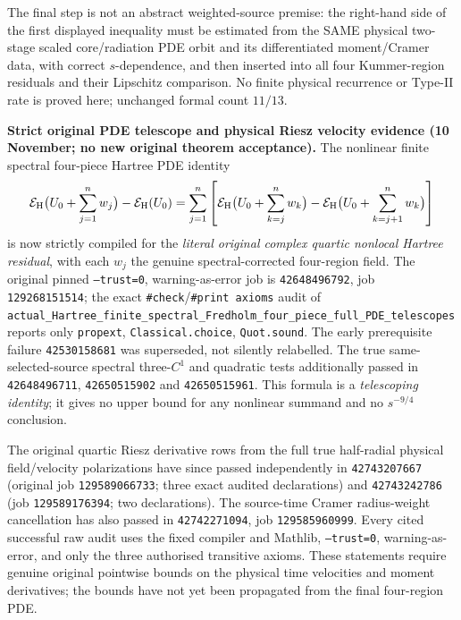 \documentclass[11pt]{amsart}
\begin{document}
The final step is not an abstract weighted-source premise: the
right-hand side of the first displayed inequality must be estimated
from the SAME physical two-stage scaled core/radiation PDE orbit and
its differentiated moment/Cramer data, with correct \(s\)-dependence,
and then inserted into all four Kummer-region residuals and their
Lipschitz comparison. No finite physical recurrence or Type-II rate
is proved here; unchanged formal count \(11/13\).



\medskip
\noindent\textbf{Strict original PDE telescope and physical Riesz velocity evidence
(10 November; no new original theorem acceptance).}
The nonlinear finite spectral four-piece Hartree PDE identity
\[
  \mathcal E_{\rm H}\bigl(U_0+\sum_{j=1}^n w_j\bigr)
  -\mathcal E_{\rm H}(U_0)
 =\sum_{j=1}^n
   \left[
     \mathcal E_{\rm H}\bigl(U_0+\sum_{k=j}^n w_k\bigr)
    -\mathcal E_{\rm H}\bigl(U_0+\sum_{k=j+1}^n w_k\bigr)
   \right]
\]
is now strictly compiled for the \emph{literal original complex quartic
nonlocal Hartree residual}, with each $w_j$ the genuine
spectral-corrected four-region field. The original pinned
\texttt{--trust=0}, warning-as-error job is
\texttt{42648496792}, job \texttt{129268151514}; the exact
\texttt{\#check}/\texttt{\#print axioms} audit of
\texttt{actual\_Hartree\_finite\_spectral\_Fredholm\_four\_piece\_full\_PDE\_telescopes}
reports only \texttt{propext}, \texttt{Classical.choice},
\texttt{Quot.sound}. The early prerequisite failure
\texttt{42530158681} was superseded, not silently relabelled.
The true same-selected-source spectral three-$C^1$ and quadratic
tests additionally passed in \texttt{42648496711},
\texttt{42650515902} and \texttt{42650515961}.
This formula is a \emph{telescoping identity}; it gives no upper bound
for any nonlinear summand and no $s^{-9/4}$ conclusion.

The original quartic Riesz derivative rows from the full true
half-radial physical field/velocity polarizations have since passed
independently in \texttt{42743207667} (original job
\texttt{129589066733}; three exact audited declarations) and
\texttt{42743242786} (job \texttt{129589176394}; two declarations).
The source-time Cramer radius-weight cancellation has also passed
in \texttt{42742271094}, job \texttt{129585960999}.
Every cited successful raw audit uses the fixed compiler and Mathlib,
\texttt{--trust=0}, warning-as-error, and only the three authorised
transitive axioms. These statements require genuine original
pointwise bounds on the physical time velocities and moment derivatives;
the bounds have not yet been propagated from the final four-region PDE.
\end{document}

